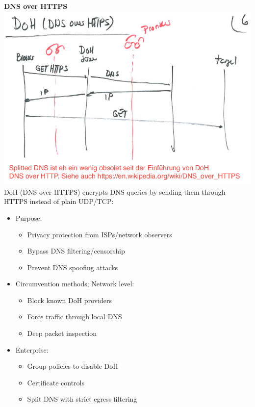 \textbf{DNS over HTTPS}
\includegraphics[width=\textwidth]{resources/03-dns-over-https.png}
DoH (DNS over HTTPS) encrypts DNS queries by sending them through HTTPS instead of plain UDP/TCP:

\begin{itemize}
  \item Purpose:
  \begin{itemize}
    \tightlist
		\item Privacy protection from ISPs/network observers
		\item Bypass DNS filtering/censorship
		\item Prevent DNS spoofing attacks
  \end{itemize}

  \item Circumvention methods; Network level:
  \begin{itemize}
    \tightlist
		\item Block known DoH providers
		\item Force traffic through local DNS
		\item Deep packet inspection
  \end{itemize}

	\item Enterprise:
  \begin{itemize}
    \tightlist
		\item Group policies to disable DoH
		\item Certificate controls
		\item Split DNS with strict egress filtering
  \end{itemize}
\end{itemize}

